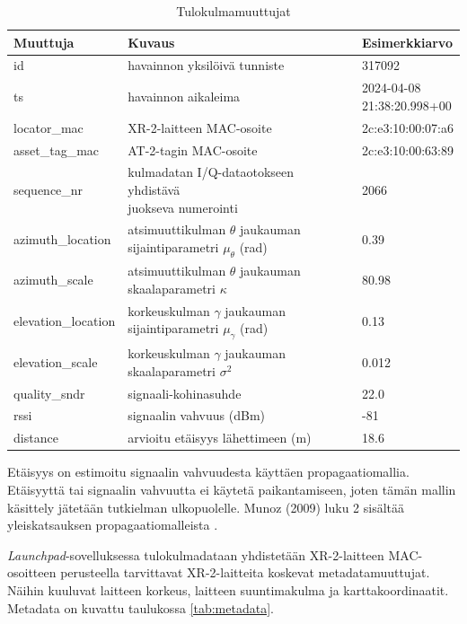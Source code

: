 \documentclass[
  12pt,
  a4paper, twoside]{book}
\begin{document}
\def\arraystretch{1.25} 
\begin{table}[H]
\centering
\begin{tabular}{|l|l|l|}
\hline
Muuttuja & Kuvaus & Esimerkkiarvo\\
\hline
id & havainnon yksilöivä tunniste & 317092 \\
ts & havainnon aikaleima & \makecell[l]{2024-04-08 \\ 21:38:20.998+00}\\
locator\_mac & XR-2-laitteen MAC-osoite & 2c:e3:10:00:07:a6
\\
asset\_tag\_mac & AT-2-tagin MAC-osoite & 2c:e3:10:00:63:89\\
sequence\_nr & \makecell[l]{kulmadatan I/Q-dataotokseen yhdistävä \\ juokseva numerointi} & 2066\\
azimuth\_location & \makecell[l]{atsimuuttikulman $\theta$ \\ jaukauman sijaintiparametri $\mu_{\theta}$ (rad)} & 0.39
\\
azimuth\_scale & \makecell[l]{atsimuuttikulman $\theta$ \\ jaukauman skaalaparametri $\kappa$} & 80.98
\\
elevation\_location & \makecell[l]{korkeuskulman $\gamma$ \\ jaukauman sijaintiparametri $\mu_{\gamma}$ (rad)} & 0.13
\\
elevation\_scale & \makecell[l]{korkeuskulman $\gamma$ \\ jaukauman skaalaparametri $\sigma^2$} & 0.012
\\
quality\_sndr & signaali-kohinasuhde & 22.0 \\
rssi & signaalin vahvuus (dBm) & -81\\
distance & arvioitu etäisyys lähettimeen (m) & 18.6\\
\hline
\end{tabular}
\caption{Tulokulmamuuttujat}
\label{tab:aoa-muuttujat}
\end{table}

Etäisyys on estimoitu signaalin vahvuudesta käyttäen propagaatiomallia. Etäisyyttä tai signaalin vahvuutta ei käytetä paikantamiseen, joten tämän mallin käsittely jätetään tutkielman ulkopuolelle. Munoz (2009) luku 2 sisältää yleiskatsauksen propagaatiomalleista \citep{Munoz-2009}.

\emph{Launchpad}-sovelluksessa tulokulmadataan yhdistetään XR-2-laitteen MAC-osoitteen perusteella tarvittavat XR-2-laitteita koskevat metadatamuuttujat. Näihin kuuluvat laitteen korkeus, laitteen suuntimakulma ja karttakoordinaatit. Metadata on kuvattu taulukossa \ref{tab:metadata}.
\end{document}
